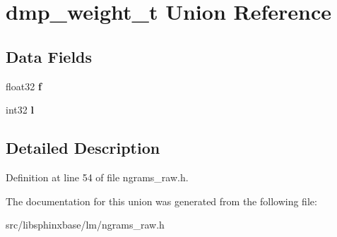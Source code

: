 \section{dmp\+\_\+weight\+\_\+t Union Reference}
\label{uniondmp__weight__t}
\subsection*{Data Fields}
\begin{DoxyCompactItemize}
\item 
\mbox{\label{uniondmp__weight__t_ac41dfac7e4cf5085a9266fd3989d6c2b}} 
float32 {\bfseries f}
\item 
\mbox{\label{uniondmp__weight__t_ae13454a86a50d88b50e0e23c6dcea109}} 
int32 {\bfseries l}
\end{DoxyCompactItemize}


\subsection{Detailed Description}


Definition at line 54 of file ngrams\+\_\+raw.\+h.



The documentation for this union was generated from the following file\+:\begin{DoxyCompactItemize}
\item 
src/libsphinxbase/lm/ngrams\+\_\+raw.\+h\end{DoxyCompactItemize}
